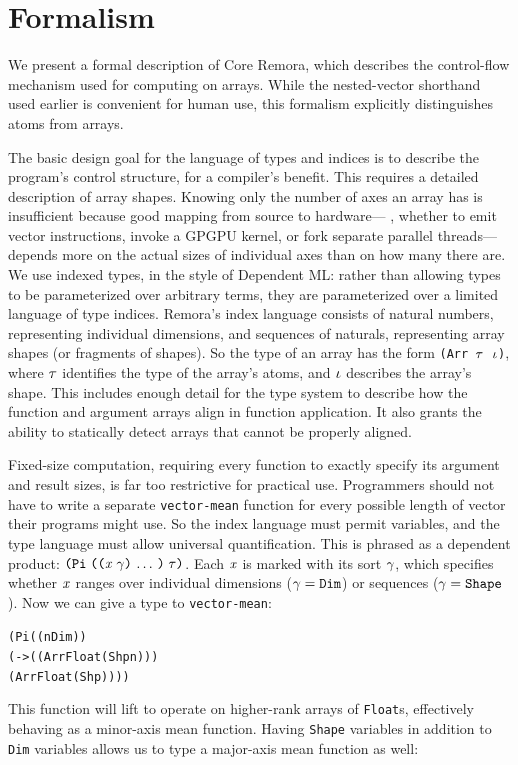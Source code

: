 \section{Formalism}
\label{sec:Formalism}

We present a formal description of Core Remora,
which describes the control-flow mechanism used for computing on arrays.
While the nested-vector shorthand used earlier is convenient for human use,
this formalism explicitly distinguishes atoms from arrays.

The basic design goal for the language of types and indices
is to describe the program's control structure,
for a compiler's benefit.
This requires a detailed description of array shapes.
Knowing only the number of axes an array has is insufficient because
good mapping from source to hardware---%
\eg, whether to emit vector instructions, invoke a GPGPU kernel, or fork separate parallel threads---%
depends more on the actual sizes of individual axes than on how many there are.
We use indexed types, in the style of Dependent ML:
rather than allowing types to be parameterized over arbitrary terms,
they are parameterized over a limited language of type indices.
Remora's index language consists of natural numbers, representing individual dimensions,
and sequences of naturals, representing array shapes
(or fragments of shapes).
So the type of an array has the form
{\tt (Arr $\mathit{\tau}$ $\mathit{\iota}$)},
where $\mathit{\tau}$ identifies the type of the array's atoms,
and $\mathit{\iota}$ describes the array's shape.
This includes enough detail for the type system to describe
how the function and argument arrays align in function application.
It also grants the ability to statically detect arrays that cannot be properly aligned.

Fixed-size computation,
requiring every function to exactly specify its argument and result sizes,
is far too restrictive for practical use.
Programmers should not have to write a separate {\tt vector-mean} function
for every possible length of vector their programs might use.
So the index language must permit variables,
and the type language must allow universal quantification.
This is phrased as a dependent product:
$\typedprod{\sequence{\notevar{\var}{\sort}}}{\type}$.
Each $\mathit{x}$ is marked with its sort $\mathit{\gamma}$,
which specifies whether $\mathit{x}$ ranges over
individual dimensions ($\mathit{\gamma} = \text{\tt Dim}$)
or sequences ($\mathit{\gamma} = \text{\tt Shape}$).
Now we can give a type to {\tt vector-mean}:

\begin{alltt}
(Pi ((n Dim))
  (-> ((Arr Float (Shp n)))
      (Arr Float (Shp))))
\end{alltt}
This function will lift to operate on higher-rank arrays of {\tt Float}s,
effectively behaving as a minor-axis mean function.
Having {\tt Shape} variables in addition to {\tt Dim} variables
allows us to type a major-axis mean function as well:

